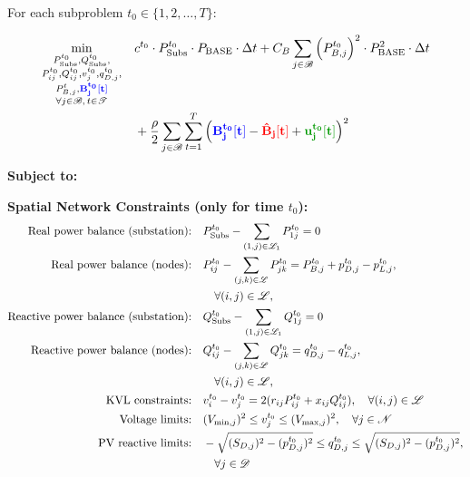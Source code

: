 For each subproblem $t_0 \in \{1, 2, \ldots, T\}$:

\begin{align}
\min_{\substack{P_{\text{Subs}}^{t_0}, Q_{\text{Subs}}^{t_0}, \\ P_{ij}^{t_0}, Q_{ij}^{t_0}, v_j^{t_0}, q_{D,j}^{t_0}, \\ P_{B,j}^t, \textcolor{blue}{\mathbf{B_j^{t_0}[t]}} \\ \forall j \in \mathcal{B}, \, t \in \mathcal{T}}} \quad & c^{t_0} \cdot P_{\text{Subs}}^{t_0} \cdot P_{\text{BASE}} \cdot \Delta t + C_B \sum_{j \in \mathcal{B}} \left(P_{B,j}^{t_0}\right)^2 \cdot P_{\text{BASE}}^2 \cdot \Delta t \notag \\
& + \frac{\rho}{2} \sum_{j \in \mathcal{B}} \sum_{t=1}^T \left( \textcolor{blue}{\mathbf{B_j^{t_0}[t]}} - \textcolor{red}{\mathbf{\hat{B}_j[t]}} + \textcolor{green!60!black}{\mathbf{u_j^{t_0}[t]}} \right)^2
\end{align}

\textbf{Subject to:}

\textbf{Spatial Network Constraints (only for time $t_0$):}
\begin{align}
\text{Real power balance (substation):} \quad & P_{\text{Subs}}^{t_0} - \sum_{(1,j) \in \mathcal{L}_1} P_{1j}^{t_0} = 0 \\
\text{Real power balance (nodes):} \quad & P_{ij}^{t_0} - \sum_{(j,k) \in \mathcal{L}} P_{jk}^{t_0} = P_{B,j}^{t_0} + p_{D,j}^{t_0} - p_{L,j}^{t_0}, \notag \\
& \quad \forall (i,j) \in \mathcal{L}, \\
\text{Reactive power balance (substation):} \quad & Q_{\text{Subs}}^{t_0} - \sum_{(1,j) \in \mathcal{L}_1} Q_{1j}^{t_0} = 0 \\
\text{Reactive power balance (nodes):} \quad & Q_{ij}^{t_0} - \sum_{(j,k) \in \mathcal{L}} Q_{jk}^{t_0} = q_{D,j}^{t_0} - q_{L,j}^{t_0}, \notag \\
& \quad \forall (i,j) \in \mathcal{L}, \\
\text{KVL constraints:} \quad & v_i^{t_0} - v_j^{t_0} = 2(r_{ij} P_{ij}^{t_0} + x_{ij} Q_{ij}^{t_0}), \quad \forall (i,j) \in \mathcal{L} \\
\text{Voltage limits:} \quad & (V_{\min,j})^2 \leq v_j^{t_0} \leq (V_{\max,j})^2, \quad \forall j \in \mathcal{N} \\
\text{PV reactive limits:} \quad & -\sqrt{(S_{D,j})^2 - (p_{D,j}^{t_0})^2} \leq q_{D,j}^{t_0} \leq \sqrt{(S_{D,j})^2 - (p_{D,j}^{t_0})^2}, \notag \\
& \quad \forall j \in \mathcal{D}
\end{align}

